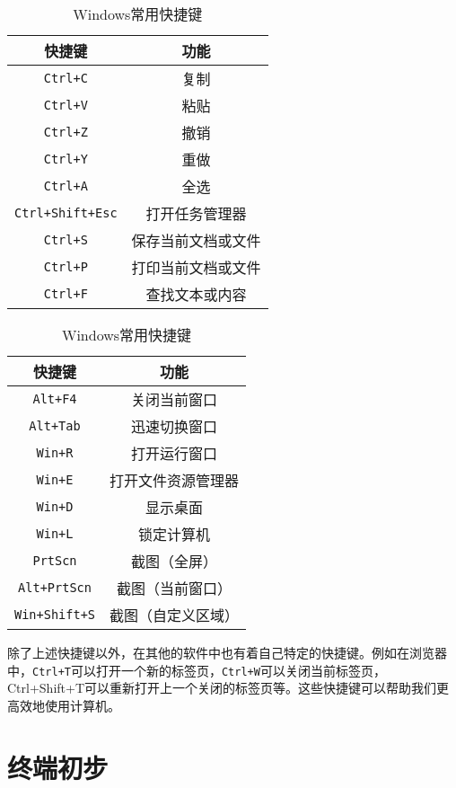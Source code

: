 \documentclass[../main.tex]{subfiles}
\begin{document}
\begin{table}[htbp]
  \centering
  \caption{Windows常用快捷键}
  \label{tab:windows-shortcuts}
  \begin{tabular}[t]{c|c}
    \hline
    \textbf{快捷键} & \textbf{功能} \\
    \hline
    \texttt{Ctrl+C} & 复制 \\
    \texttt{Ctrl+V} & 粘贴 \\
    \texttt{Ctrl+Z} & 撤销 \\
    \texttt{Ctrl+Y} & 重做 \\
    \texttt{Ctrl+A} & 全选 \\
    \texttt{Ctrl+Shift+Esc} & 打开任务管理器 \\
    \texttt{Ctrl+S} & 保存当前文档或文件 \\
    \texttt{Ctrl+P} & 打印当前文档或文件 \\
    \texttt{Ctrl+F} & 查找文本或内容 \\
    \hline
  \end{tabular}
  \qquad
  \begin{tabular}[t]{c|c}
    \hline
    \textbf{快捷键} & \textbf{功能} \\
    \hline
    \texttt{Alt+F4} & 关闭当前窗口 \\
    \texttt{Alt+Tab} & 迅速切换窗口 \\
    \texttt{Win+R} & 打开运行窗口 \\
    \texttt{Win+E} & 打开文件资源管理器 \\
    \texttt{Win+D} & 显示桌面 \\
    \texttt{Win+L} & 锁定计算机 \\
    \texttt{PrtScn} & 截图（全屏） \\
    \texttt{Alt+PrtScn} & 截图（当前窗口） \\
    \texttt{Win+Shift+S} & 截图（自定义区域） \\
    \hline
  \end{tabular}
\end{table}

除了上述快捷键以外，在其他的软件中也有着自己特定的快捷键。例如在浏览器中，\texttt{Ctrl+T}可以打开一个新的标签页，\texttt{Ctrl+W}可以关闭当前标签页，Ctrl+Shift+T可以重新打开上一个关闭的标签页等。这些快捷键可以帮助我们更高效地使用计算机。

\section{终端初步}\label{sec:terminal}
\end{document}
